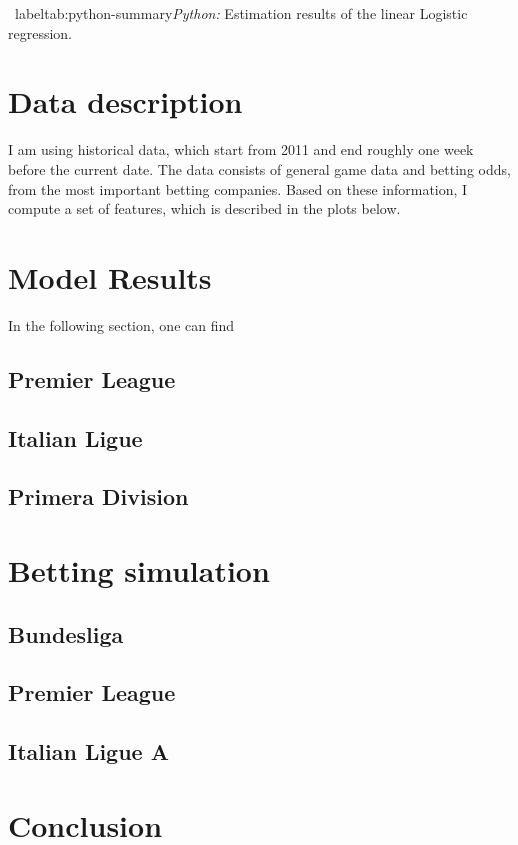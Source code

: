 \documentclass[11pt, a4paper, leqno]{article}
\begin{document}
\begin{table}[!h]
    
    \caption{\ label{tab:python-summary}\emph{Python:} Estimation results of the
        linear Logistic regression.}
\end{table}

\section{Data description}
I am using historical data, which start from 2011 and end roughly one week before the current date. The data consists of general game data and betting odds, from the most important
betting companies. Based on these information, I compute a set of features, which is described in the plots below.

\section{Model Results}
In the following section, one can find
\subsection{Premier League}
\subsection{Italian Ligue }
\subsection{Primera Division}
\section{Betting simulation}
\subsection{Bundesliga}
\subsection{Premier League}
\subsection{Italian Ligue A}
\section{Conclusion}







\end{document}
